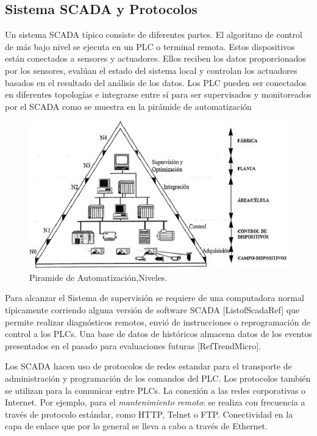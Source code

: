 \documentclass[jou,apacite]{apa6}   %
\begin{document}
\subsection{Sistema SCADA y Protocolos }
Un sistema SCADA típico consiste de diferentes partes. El algoritmo de control de más bajo nivel se ejecuta en un PLC o terminal remota. Estos dispositivos están conectados a sensores y actuadores. Ellos reciben los datos proporcionados por los sensores, evalúan el estado del sistema local  y controlan los actuadores basados en el resultado del análisis de los datos. Los PLC pueden ser conectados en diferentes topologías e integrarse entre sí para ser supervisados y monitoreados por el SCADA como se muestra en la pirámide de automatización 
\begin{figure}[htb]
\centering
\includegraphics[scale=0.4]{images/piramide.png}
\caption{Piramide de Automatización,Niveles.} \label{fig:piramide}
\end{figure}
Para alcanzar el Sistema de supervisión se requiere de una computadora normal típicamente corriendo alguna versión de software SCADA  [ListofScadaRef] que permite realizar diagnósticos remotos, envió de instrucciones o reprogramación de control a los PLCs. Una base de datos de históricos almacena datos de los eventos presentados  en el pasado para evaluaciones futuras [RefTrendMicro]. 

Los SCADA hacen uso de protocolos de redes estandar para el transporte de administración y  programación de los comandos del PLC. Los protocolos también se utilizan para la comunicar entre PLCs. La conexión a las redes corporativas o Internet. Por ejemplo, para el \textit{mantenimiento remoto}: se realiza con frecuencia a través de protocolo estándar, como HTTP, Telnet o FTP. Conectividad en la capa de enlace que por lo general se lleva a cabo a través de Ethernet.
\end{document}

